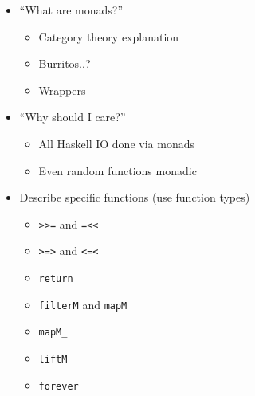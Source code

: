 \documentclass{scrarticle}
\begin{document}
    \begin{itemize}
        \item ``What are monads?''
        \begin{itemize}
            \item Category theory explanation
            \item Burritos..?
            \item Wrappers
        \end{itemize}
        \item ``Why should I care?''
        \begin{itemize}
            \item All Haskell IO done via monads
            \item Even random functions monadic
        \end{itemize}
        \item Describe specific functions (use function types)
        \begin{itemize}
            \item \texttt{>>=} and \texttt{=<<}
            \item \texttt{>=>} and \texttt{<=<}
            \item \texttt{return}
            \item \texttt{filterM} and \texttt{mapM}
            \item \texttt{mapM\_}
            \item \texttt{liftM}
            \item \texttt{forever}
        \end{itemize}
    \end{itemize}
\end{document}
